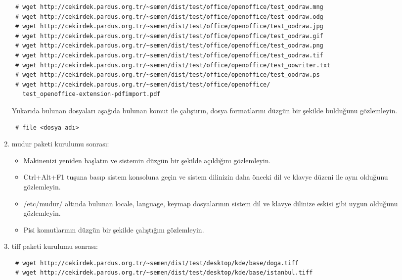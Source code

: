 \documentclass[a4paper,10pt]{article}
\begin{document}
\begin{enumerate}
\begin{verbatim}
 # wget http://cekirdek.pardus.org.tr/~semen/dist/test/office/openoffice/test_oodraw.mng
 # wget http://cekirdek.pardus.org.tr/~semen/dist/test/office/openoffice/test_oodraw.odg
 # wget http://cekirdek.pardus.org.tr/~semen/dist/test/office/openoffice/test_oodraw.jpg
 # wget http://cekirdek.pardus.org.tr/~semen/dist/test/office/openoffice/test_oodraw.gif
 # wget http://cekirdek.pardus.org.tr/~semen/dist/test/office/openoffice/test_oodraw.png
 # wget http://cekirdek.pardus.org.tr/~semen/dist/test/office/openoffice/test_oodraw.tif
 # wget http://cekirdek.pardus.org.tr/~semen/dist/test/office/openoffice/test_oowriter.txt
 # wget http://cekirdek.pardus.org.tr/~semen/dist/test/office/openoffice/test_oodraw.ps
 # wget http://cekirdek.pardus.org.tr/~semen/dist/test/office/openoffice/
   test_openoffice-extension-pdfimport.pdf
\end{verbatim}

Yukarıda bulunan dosyaları aşağıda bulunan komut ile çalıştırın, dosya formatlarını düzgün bir şekilde bulduğunu gözlemleyin.
\begin{verbatim}
 # file <dosya adı>
\end{verbatim}

\item mudur paketi kurulumu sonrası:

\begin{itemize}
  \item Makinenizi yeniden başlatın ve sistemin düzgün bir şekilde açıldığını  gözlemleyin.
 \item Ctrl+Alt+F1 tuşuna basıp sistem konsoluna geçin ve sistem dilinizin daha önceki dil ve klavye düzeni ile aynı olduğunu gözlemleyin.
  \item /etc/mudur/ altında bulunan locale, language, keymap dosyalarının sistem dil ve klavye dilinize eskisi gibi uygun olduğunu gözlemleyin.
 \item Pisi komutlarının düzgün bir şekilde çalıştığını gözlemleyin. 

\end{itemize}
\item tiff paketi kurulumu sonrası:
\begin{verbatim}
 # wget http://cekirdek.pardus.org.tr/~semen/dist/test/desktop/kde/base/doga.tiff
 # wget http://cekirdek.pardus.org.tr/~semen/dist/test/desktop/kde/base/istanbul.tiff
\end{verbatim}


\end{enumerate}
\end{document}
